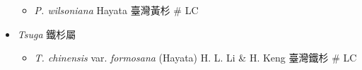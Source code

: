 \begin{itemize}
  \begin{itemize}
        \item[] \textit{P. wilsoniana} Hayata  臺灣黃杉  \# LC
  \end{itemize}
 \item[] \textit{Tsuga} 鐵杉屬
                            
  \begin{itemize}
        \item[] \textit{T. chinensis} var. \textit{formosana} (Hayata) H. L. Li \& H. Keng 
                                    臺灣鐵杉  \# LC
  \end{itemize}
  \end{itemize}
